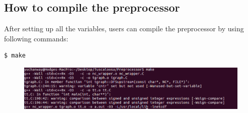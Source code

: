 \documentclass[12pt, letterpaper]{article}
\begin{document}
\begin{appendices}
\begin{flushleft}
%
%
%

\subsection*{How to compile the preprocessor}
After setting up all the variables, users can compile the preprocessor by using following commands:
\begin{lstlisting}[frame=single]
$ make
\end{lstlisting}
\begin{figure}[H]
	\centering
	\includegraphics[width = 1.0\textwidth]{figure/make.png} %
	\label{fig:process}%
\end{figure}


\end{flushleft}
\end{appendices}
\end{document}
